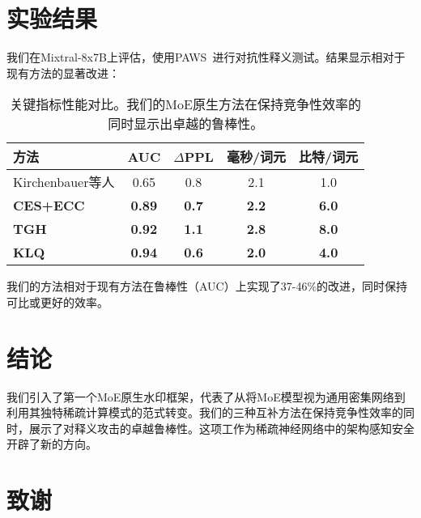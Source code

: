 \documentclass[letterpaper,twocolumn,10pt]{article}
\begin{document}
\section{实验结果}

我们在Mixtral-8x7B上评估，使用PAWS~\cite{zhang2019paws}进行对抗性释义测试。结果显示相对于现有方法的显著改进：

\begin{table}[h]
\centering
\small
\begin{tabular}{|l|c|c|c|c|}
\hline
\textbf{方法} & \textbf{AUC} & \textbf{$\Delta$PPL} & \textbf{毫秒/词元} & \textbf{比特/词元} \\
\hline
Kirchenbauer等人 & 0.65 & 0.8 & 2.1 & 1.0 \\
\textbf{CES+ECC} & \textbf{0.89} & \textbf{0.7} & \textbf{2.2} & \textbf{6.0} \\
\textbf{TGH} & \textbf{0.92} & \textbf{1.1} & \textbf{2.8} & \textbf{8.0} \\
\textbf{KLQ} & \textbf{0.94} & \textbf{0.6} & \textbf{2.0} & \textbf{4.0} \\
\hline
\end{tabular}
\caption{关键指标性能对比。我们的MoE原生方法在保持竞争性效率的同时显示出卓越的鲁棒性。}
\end{table}

我们的方法相对于现有方法在鲁棒性（AUC）上实现了37-46\%的改进，同时保持可比或更好的效率。

\section{结论}

我们引入了第一个MoE原生水印框架，代表了从将MoE模型视为通用密集网络到利用其独特稀疏计算模式的范式转变。我们的三种互补方法在保持竞争性效率的同时，展示了对释义攻击的卓越鲁棒性。这项工作为稀疏神经网络中的架构感知安全开辟了新的方向。

\section*{致谢}
\end{document}
